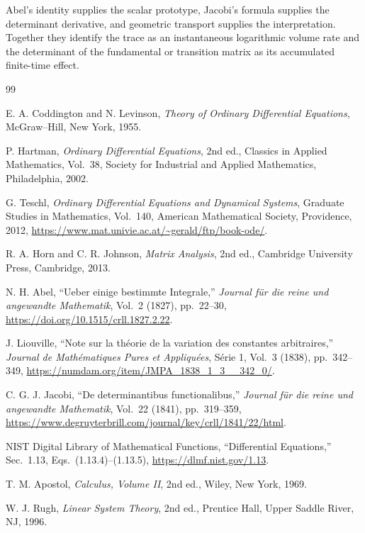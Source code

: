 \documentclass[11pt,a4paper]{article}
\theoremstyle{definition}
\numberwithin{equation}{section}
\begin{document}
Abel's identity supplies the scalar prototype, Jacobi's formula supplies the determinant derivative, and geometric transport supplies the interpretation. Together they identify the trace as an instantaneous logarithmic volume rate and the determinant of the fundamental or transition matrix as its accumulated finite-time effect.

\begingroup\small
\begin{thebibliography}{99}

E. A. Coddington and N. Levinson,
\textit{Theory of Ordinary Differential Equations},
McGraw--Hill, New York, 1955.

P. Hartman,
\textit{Ordinary Differential Equations}, 2nd ed.,
Classics in Applied Mathematics, Vol.~38,
Society for Industrial and Applied Mathematics, Philadelphia, 2002.

G. Teschl,
\textit{Ordinary Differential Equations and Dynamical Systems},
Graduate Studies in Mathematics, Vol.~140,
American Mathematical Society, Providence, 2012,
\url{https://www.mat.univie.ac.at/~gerald/ftp/book-ode/}.

R. A. Horn and C. R. Johnson,
\textit{Matrix Analysis}, 2nd ed.,
Cambridge University Press, Cambridge, 2013.

N. H. Abel,
``Ueber einige bestimmte Integrale,''
\textit{Journal f\"ur die reine und angewandte Mathematik},
Vol.~2 (1827), pp.~22--30,
\url{https://doi.org/10.1515/crll.1827.2.22}.

J. Liouville,
``Note sur la th\'eorie de la variation des constantes arbitraires,''
\textit{Journal de Math\'ematiques Pures et Appliqu\'ees},
S\'erie 1, Vol.~3 (1838), pp.~342--349,
\url{https://numdam.org/item/JMPA_1838_1_3__342_0/}.

C. G. J. Jacobi,
``De determinantibus functionalibus,''
\textit{Journal f\"ur die reine und angewandte Mathematik},
Vol.~22 (1841), pp.~319--359,
\url{https://www.degruyterbrill.com/journal/key/crll/1841/22/html}.

NIST Digital Library of Mathematical Functions,
``Differential Equations,'' Sec.~1.13, Eqs.~(1.13.4)--(1.13.5),
\url{https://dlmf.nist.gov/1.13}.

T. M. Apostol,
\textit{Calculus, Volume II}, 2nd ed.,
Wiley, New York, 1969.

W. J. Rugh,
\textit{Linear System Theory}, 2nd ed.,
Prentice Hall, Upper Saddle River, NJ, 1996.


\end{thebibliography}
\end{document}
